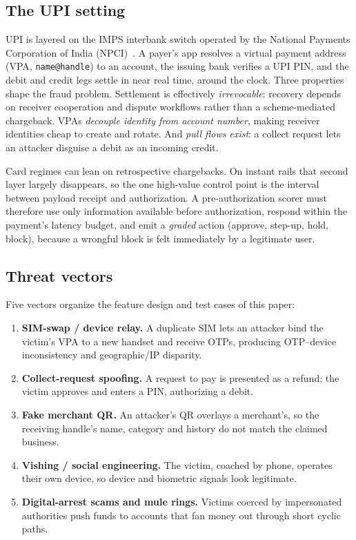 \documentclass[conference]{IEEEtran}
\begin{document}
\subsection{The UPI setting}
UPI is layered on the IMPS interbank switch operated by the National Payments Corporation of India (NPCI)~\cite{npci}. A payer's app resolves a virtual payment address (VPA, \texttt{name@\allowbreak{}handle}) to an account, the issuing bank verifies a UPI PIN, and the debit and credit legs settle in near real time, around the clock. Three properties shape the fraud problem. Settlement is effectively \emph{irrevocable}: recovery depends on receiver cooperation and dispute workflows rather than a scheme-mediated chargeback. VPAs \emph{decouple identity from account number}, making receiver identities cheap to create and rotate. And \emph{pull flows exist}: a collect request lets an attacker disguise a debit as an incoming credit.

Card regimes can lean on retrospective chargebacks. On instant rails that second layer largely disappears, so the one high-value control point is the interval between payload receipt and authorization. A pre-authorization scorer must therefore use only information available before authorization, respond within the payment's latency budget, and emit a \emph{graded} action (approve, step-up, hold, block), because a wrongful block is felt immediately by a legitimate user.

\subsection{Threat vectors}
Five vectors organize the feature design and test cases of this paper:
\begin{enumerate}
\item \textbf{SIM-swap / device relay.} A duplicate SIM lets an attacker bind the victim's VPA to a new handset and receive OTPs, producing OTP--device inconsistency and geographic/IP disparity.
\item \textbf{Collect-request spoofing.} A request to pay is presented as a refund; the victim approves and enters a PIN, authorizing a debit.
\item \textbf{Fake merchant QR.} An attacker's QR overlays a merchant's, so the receiving handle's name, category and history do not match the claimed business.
\item \textbf{Vishing / social engineering.} The victim, coached by phone, operates their own device, so device and biometric signals look legitimate.
\item \textbf{Digital-arrest scams and mule rings.} Victims coerced by impersonated authorities push funds to accounts that fan money out through short cyclic paths.
\end{enumerate}
\end{document}
